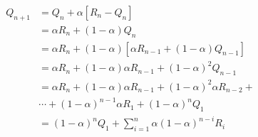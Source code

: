 \begin{align*}
    Q_{n+1} & = Q_n + \alpha [ R_n - Q_n ]                                                 \\
            & = \alpha R_n + (1 - \alpha) Q_n                                              \\
            & = \alpha R_n + (1 - \alpha) [ \alpha R_{n-1} + (1 - \alpha) Q_{n-1} ]        \\
            & = \alpha R_n + (1 - \alpha) \alpha R_{n-1} + (1 - \alpha)^2 Q_{n-1}          \\
            & = \alpha R_n + (1 - \alpha) \alpha R_{n-1} + (1 - \alpha)^2 \alpha R_{n-2} + \\
            & \cdots + (1 - \alpha)^{n-1} \alpha R_1 + (1 - \alpha)^n Q_1                  \\
            & = (1 - \alpha)^n Q_1 + \sum_{i=1}^{n} \alpha (1 - \alpha)^{n-i} R_i          \\
\end{align*}

